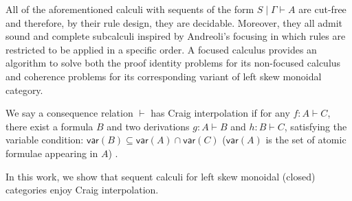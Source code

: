 \documentclass[submission,copyright,creativecommons]{eptcs}
\theoremstyle{definition}
\newcommand{\GG}{\Gamma}
\newcommand{\GT}{\Theta}
\newcommand{\vd}{\vdash}
\newcommand{\LSkG}{$\mathtt{LSkG}$}
\newcommand{\LSkT}{$\mathtt{LSkT}$}
\newcommand{\vars}[1]{\mathsf{var}(#1)}
\begin{document}
All of the aforementioned calculi with sequents of the form $S \mid \GG \vd A$ are cut-free and therefore, by their rule design, they are decidable.
Moreover, they all admit sound and complete subcalculi inspired by Andreoli's focusing \cite{andreoli:logic:1992} in which
rules are restricted to be applied in a specific order.
A focused calculus provides an algorithm to solve both the proof identity problems for its non-focused calculus and coherence problems for its corresponding variant of left skew monoidal category.

We say a consequence relation $\vdash$ has Craig interpolation if for any $f: A \vdash C$, there exist a formula $B$ and two derivations $g: A \vdash B$ and $h: B \vdash C$, satisfying the variable condition: $\vars{B} \subseteq \vars{A} \cap \vars{C}$ ($\vars{A}$ is the set of atomic formulae appearing in $A$) \cite{craig:interpolation:1957}.

In this work, we show that sequent calculi for left skew monoidal (closed) categories enjoy Craig interpolation.



\end{document}
